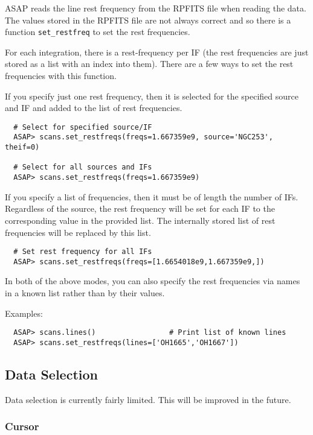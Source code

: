 \documentclass[11pt]{article}
\newcommand{\cmd}[1]{{\tt #1}}
\begin{document}
ASAP reads the line rest frequency from the RPFITS file when reading
the data. The values stored in the RPFITS file are not always correct
and so there is a function \cmd{set\_restfreq} to set the rest frequencies.

For each integration, there is a rest-frequency per IF (the rest
frequencies are just stored as a list with an index into them).
There are a few ways to set the rest frequencies with this function.

If you specify just one rest frequency, then it is selected for the
specified source and IF and added to the list of rest frequencies.

\begin{verbatim}
  # Select for specified source/IF
  ASAP> scans.set_restfreqs(freqs=1.667359e9, source='NGC253', theif=0)

  # Select for all sources and IFs
  ASAP> scans.set_restfreqs(freqs=1.667359e9)
\end{verbatim}


If you specify a list of frequencies, then it must be of length the
number of IFs.  Regardless of the source, the rest frequency will be set
for each IF to the corresponding value in the provided list.  The
internally stored list of rest frequencies will be replaced by this
list.


\begin{verbatim}
  # Set rest frequency for all IFs
  ASAP> scans.set_restfreqs(freqs=[1.6654018e9,1.667359e9,])

\end{verbatim}

In both of the above modes, you can also specify the rest frequencies via
names in a known list rather than by their values.

Examples:

\begin{verbatim}
  ASAP> scans.lines()                 # Print list of known lines
  ASAP> scans.set_restfreqs(lines=['OH1665','OH1667'])
\end{verbatim}


\subsection{Data Selection}

Data selection is currently fairly limited. This will be improved in
the future.


\subsubsection{Cursor}
\end{document}
